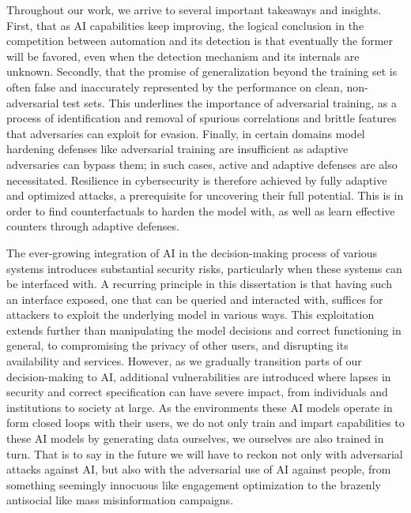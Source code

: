 Throughout our work, we arrive to several important takeaways and insights.
First, that as \gls{AI} capabilities keep improving, the logical conclusion in the competition between automation and its detection is that eventually the former will be favored, even when the detection mechanism and its internals are unknown.
Secondly, that the promise of generalization beyond the training set is often false and inaccurately represented by the performance on clean, non-adversarial test sets.
This underlines the importance of adversarial training, as a process of identification and removal of spurious correlations and brittle features that adversaries can exploit for evasion.
Finally, in certain domains model hardening defenses like adversarial training are insufficient as adaptive adversaries can bypass them; in such cases, active and adaptive defenses are also necessitated.
Resilience in cybersecurity is therefore achieved by fully adaptive and optimized attacks, a prerequisite for uncovering their full potential.
This is in order to find counterfactuals to harden the model with, as well as learn effective counters through adaptive defenses.

The ever-growing integration of \gls{AI} in the decision-making process of various systems introduces substantial security risks, particularly when these systems can be interfaced with.
A recurring principle in this dissertation is that having such an interface exposed, one that can be queried and interacted with, suffices for attackers to exploit the underlying model in various ways.
This exploitation extends further than manipulating the model decisions and correct functioning in general, to compromising the privacy of other users, and disrupting its availability and services.
However, as we gradually transition parts of our decision-making to AI, additional vulnerabilities are introduced where lapses in security and correct specification can have severe impact, from individuals and institutions to society at large. 
As the environments these AI models operate in form closed loops with their users, we do not only train and impart capabilities to these \gls{AI} models by generating data ourselves, we ourselves are also trained in turn.
That is to say in the future we will have to reckon not only with adversarial attacks against \gls{AI}, but also with the adversarial use of \gls{AI} against people, from something seemingly innocuous like engagement optimization to the brazenly antisocial like mass misinformation campaigns.


